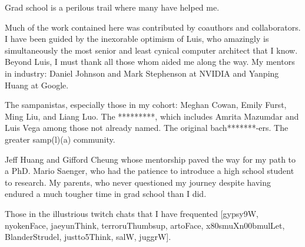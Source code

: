Grad school is a perilous trail where many have helped me.

Much of the work contained here was contributed by coauthors and collaborators.
I have been guided by the inexorable optimism of Luis, who amazingly is simultaneously the most senior and least cynical computer architect that I know.
Beyond Luis, I must thank all those whom aided me along the way.
My mentors in industry: Daniel Johnson and Mark Stephenson at NVIDIA and Yanping Huang at Google.

The sampanistas, especially those in my cohort: Meghan Cowan, Emily Furst, Ming Liu, and Liang Luo.
The *********, which includes Amrita Mazumdar and Luis Vega among those not already named.
The original bach*******-ers. 
The greater samp(l)(a) community.

Jeff Huang and Gifford Cheung whose mentorship paved the way for my path to a PhD.
Mario Saenger, who had the patience to introduce a high school student to research.
My parents, who never questioned my journey despite having endured a much tougher time in grad school than I did.

Those in the illustrious twitch chats that I have frequented [gypsy9W, nyokenFace, jaeyunThink, terroruThumbsup, artoFace, x80smuXn00bmulLet, BlanderStrudel, justto5Think, salW, juggrW].
